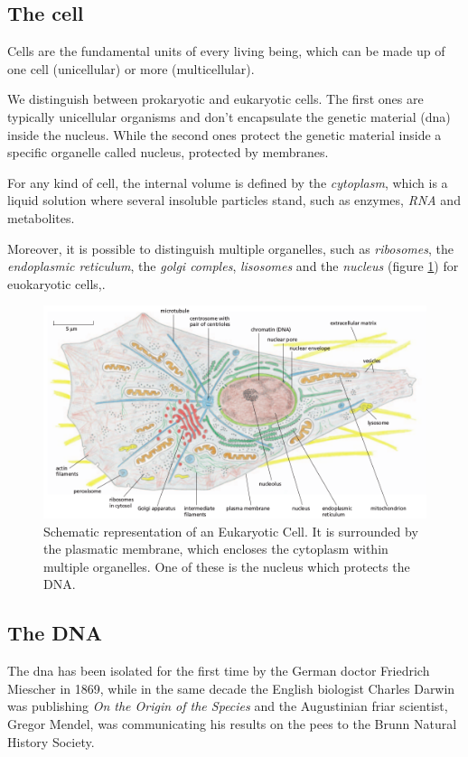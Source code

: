 \subsection{The cell}
\label{sec:cell}
Cells are the fundamental units of every living being, which can be made up of one cell (unicellular) or more (multicellular).

We distinguish between prokaryotic and eukaryotic cells. 
The first ones are typically unicellular organisms and don't encapsulate the genetic material (\gls{dna}) inside the nucleus.
While the second ones protect the genetic material inside a specific organelle called nucleus, protected by membranes.

For any kind of cell, the internal volume is defined by the \textit{cytoplasm}, which is a liquid solution where several insoluble particles stand, such as enzymes, \textit{RNA} and metabolites.

Moreover, it is possible to distinguish multiple organelles, such as \textit{ribosomes}, the \textit{endoplasmic reticulum}, the \textit{golgi comples}, \textit{lisosomes} and the \textit{nucleus} (figure \ref{fig:cell}) for euokaryotic cells,.

\begin{figure}[h]
\centering
\includegraphics[width=\textwidth, keepaspectratio]{img/intro/cell.png}
\caption[The Cell]{Schematic representation of an Eukaryotic Cell. 
It is surrounded by the plasmatic membrane, which encloses the cytoplasm within multiple organelles. 
One of these is the nucleus which protects the DNA.}
\label{fig:cell}
\end{figure}

\subsection{The DNA}
\label{sec:genica}
The \gls{dna} has been isolated for the first time by the German doctor Friedrich Miescher in 1869, while in the same decade the English biologist Charles Darwin was publishing \textit{On the Origin of the Species} and the  Augustinian friar scientist, Gregor Mendel, was communicating his results on the pees to the Brunn Natural History Society.

